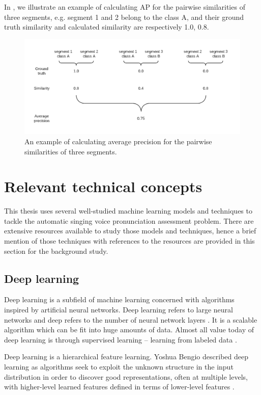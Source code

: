 In , we illustrate an example of calculating AP for the pairwise similarities of three segments, e.g. segment 1 and 2 belong to the class A, and their ground truth similarity and calculated similarity are respectively 1.0, 0.8.

\begin{figure}[ht!]
\includegraphics[width=\textwidth]{figs/blockDiags_rong/ch2_average_precision.png}
\caption{An example of calculating average precision for the pairwise similarities of three segments.}
\label{fig:ch2_average_precision}
\end{figure}

\section{Relevant technical concepts}

This thesis uses several well-studied machine learning models and techniques to tackle the automatic singing voice pronunciation assessment problem. There are extensive resources available to study those models and techniques, hence a brief mention of those techniques with references to the resources are provided in this section for the background study.

\subsection{Deep learning}

Deep learning is a subfield of machine learning concerned with algorithms inspired by artificial neural networks. Deep learning refers to large neural networks and deep refers to the number of neural network layers \cite{Dean}. It is a scalable algorithm which can be fit into huge amounts of data. Almost all value today of deep learning is through supervised learning -- learning from labeled data \cite{Ng}. 

Deep learning is a hierarchical feature learning. Yoshua Bengio described deep learning as algorithms seek to exploit the unknown structure in the input distribution in order to discover good representations, often at multiple levels, with higher-level learned features defined in terms of lower-level features \cite{Bengio2012a}.

